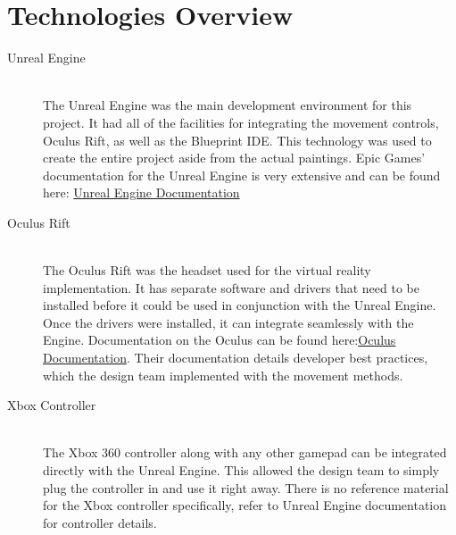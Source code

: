 \section{Technologies Overview}
\begin{description}
\item[Unreal Engine] \hfill \\
	The Unreal Engine was the main development environment for this project.  It had all of the facilities for integrating the movement controls, Oculus Rift, as well as the Blueprint IDE.  This technology was used to create the entire project aside from the actual paintings.  Epic Games' documentation for the Unreal Engine is very extensive and can be found here: \href{https://docs.unrealengine.com/latest/INT/}{Unreal Engine Documentation}
	
\item[Oculus Rift] \hfill \\
	The Oculus Rift was the headset used for the virtual reality implementation.  It has separate software and drivers that need to be installed before it could be used in conjunction with the Unreal Engine.  Once the drivers were installed, it can integrate seamlessly with the Engine.  Documentation on the Oculus can be found here:\href{https://developer.oculus.com/documentation/intro-vr/latest/concepts/bp_app_imaging/}{Oculus Documentation}.  Their documentation details developer best practices, which the design team implemented with the movement methods.
	
\item[Xbox Controller] \hfill \\
	The Xbox 360 controller along with any other gamepad can be integrated directly with the Unreal Engine.  This allowed the design team to simply plug the controller in and use it right away.  There is no reference material for the Xbox controller specifically, refer to Unreal Engine documentation for controller details.
\end{description}



